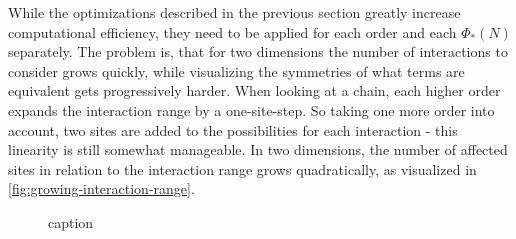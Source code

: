 While the optimizations described in the previous section greatly increase computational efficiency, they need to be applied for each order and each $\Phi_\ast(N)$ separately.
The problem is, that for two dimensions the number of interactions to consider grows quickly, while visualizing the symmetries of what terms are equivalent gets progressively harder.
When looking at a chain, each higher order expands the interaction range by a one-site-step. 
So taking one more order into account, two sites are added to the possibilities for each interaction - this linearity is still somewhat manageable.
In two dimensions, the number of affected sites in relation to the interaction range grows quadratically, as visualized in \autoref{fig:growing-interaction-range}.

\begin{figure}[htbp]
    \centering
    
    \caption{caption}
    \label{fig:growing-interaction-range}
\end{figure}
